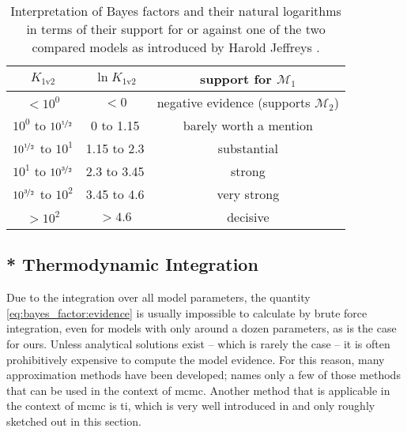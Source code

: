 \documentclass[\relativeRoot/main.tex]{subfiles}
\begin{document}
\begin{table}
    \centering
    \begin{tabular}{ | c | c | c | }
        \hline
        $K_\text{1v2}$ & $\ln{K_\text{1v2}}$ & support for $\mathcal{M}_1$ \\
        \hline
        $< 10^0$ & $< 0$ & negative evidence (supports $\mathcal{M}_2$) \\
        $10^0$ to $10^{\nicefrac{1}{2}}$ & 0 to 1.15 & barely worth a mention \\
        $10^{\nicefrac{1}{2}}$ to $10^1$ & 1.15 to 2.3 & substantial \\
        $10^1$ to $10^{\nicefrac{3}{2}}$ & 2.3 to 3.45 & strong \\
        $10^{\nicefrac{3}{2}}$ to $10^2$ & 3.45 to 4.6 & very strong \\
        $> 10^2$ & $> 4.6$ & decisive \\
        \hline
    \end{tabular}
    \caption[Interpretation of ranges of Bayes factors]{Interpretation of Bayes factors and their natural logarithms in terms of their support for or against one of the two compared models as introduced by Harold Jeffreys \cite{jeffreys_theory_1998}.}
    \label{table:bayes_factor}
\end{table}

\subsection{* Thermodynamic Integration}
\label{subsec:graph:model_comp:thermo_int}

Due to the integration over all model parameters, the quantity \cref{eq:bayes_factor:evidence} is usually impossible to calculate by brute force integration, even for models with only around a dozen parameters, as is the case for ours. Unless analytical solutions exist -- which is rarely the case -- it is often prohibitively expensive to compute the model evidence. For this reason, many approximation methods have been developed; \cite{friel_estimating_2011} names only a few of those methods that can be used in the context of \gls{mcmc}. Another method that is applicable in the context of \gls{mcmc} is \gls{ti}, which is very well introduced in \cite{aponte_introduction_2022} and only roughly sketched out in this section.
\end{document}
